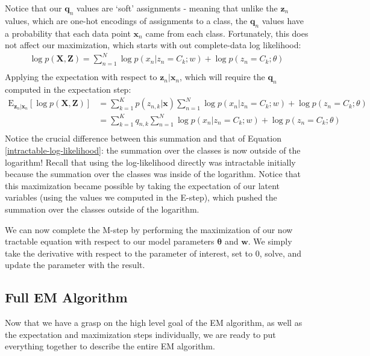 Notice that our $\textbf{q}_n$ values are `soft' assignments - meaning that unlike the $\textbf{z}_n$ values, which are one-hot encodings of assignments to a class, the $\textbf{q}_n$ values have a probability that each data point $\textbf{x}_n$ came from each class. Fortunately, this does not affect our maximization, which starts with out complete-data log likelihood:
\begin{align*}
    \log p(\textbf{X}, \textbf{Z}) = \sum_{n=1}^{N} \log p(x_n | z_n = C_k; w) + \log p(z_n = C_k; \theta) \\
\end{align*}
Applying the expectation with respect to $\textbf{z}_n | \textbf{x}_n$, which will require the $\textbf{q}_n$ computed in the expectation step:
\begin{align*}
    \mathrm{E}_{\textbf{z}_n | \textbf{x}_n} [\log p(\textbf{X}, \textbf{Z})] &= \sum_{k=1}^{K} p(z_{n, k} | \textbf{x}) \sum_{n=1}^{N} \log p(x_n | z_n = C_k; w) + \log p(z_n = C_k; \theta) \\
    &= \sum_{k=1}^{K} q_{n, k} \sum_{n=1}^{N} \log p(x_n | z_n = C_k; w) + \log p(z_n = C_k; \theta) \\
\end{align*}
Notice the crucial difference between this summation and that of Equation \ref{intractable-log-likelihood}: the summation over the classes is now outside of the logarithm! Recall that using the log-likelihood directly was intractable initially because the summation over the classes was inside of the logarithm. Notice that this maximization became possible by taking the expectation of our latent variables (using the values we computed in the E-step), which pushed the summation over the classes outside of the logarithm.

We can now complete the M-step by performing the maximization of our now tractable equation with respect to our model parameters $\boldsymbol{\theta}$ and $\textbf{w}$. We simply take the derivative with respect to the parameter of interest, set to 0, solve, and update the parameter with the result.

\subsection{Full EM Algorithm}
Now that we have a grasp on the high level goal of the EM algorithm, as well as the expectation and maximization steps individually, we are ready to put everything together to describe the entire EM algorithm.

